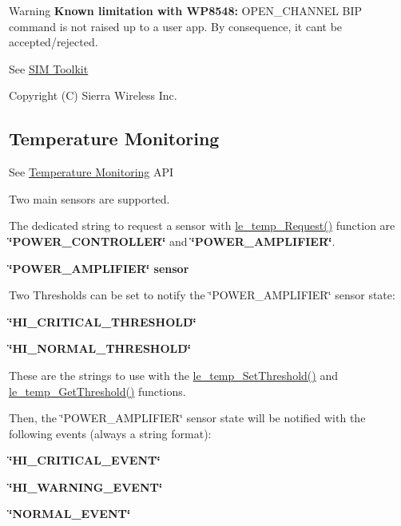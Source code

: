 \begin{DoxyWarning}{Warning}
{\bfseries Known limitation with W\+P8548\+:} O\+P\+E\+N\+\_\+\+C\+H\+A\+N\+N\+EL B\+IP command is not raised up to a user app. By consequence, it can\textquotesingle{}t be accepted/rejected.
\end{DoxyWarning}
See \hyperlink{c_sim_le_sim_stk}{S\+IM Toolkit}

Copyright (C) Sierra Wireless Inc. \hypertarget{platformConstraintsTemperature}{}\subsection{Temperature Monitoring}\label{platformConstraintsTemperature}
See \hyperlink{c_temp}{Temperature Monitoring} A\+PI

Two main sensors are supported.

The dedicated string to request a sensor with \hyperlink{le__temp__interface_8h_ada76ad1c0461ddb13608a942ce0b0912}{le\+\_\+temp\+\_\+\+Request()} function are {\bfseries \char`\"{}\+P\+O\+W\+E\+R\+\_\+\+C\+O\+N\+T\+R\+O\+L\+L\+E\+R\char`\"{}} and {\bfseries \char`\"{}\+P\+O\+W\+E\+R\+\_\+\+A\+M\+P\+L\+I\+F\+I\+E\+R\char`\"{}}.

{\bfseries \char`\"{}\+P\+O\+W\+E\+R\+\_\+\+A\+M\+P\+L\+I\+F\+I\+E\+R\char`\"{} sensor}

Two Thresholds can be set to notify the \char`\"{}\+P\+O\+W\+E\+R\+\_\+\+A\+M\+P\+L\+I\+F\+I\+E\+R\char`\"{} sensor state\+:
\begin{DoxyItemize}
\item {\bfseries \char`\"{}\+H\+I\+\_\+\+C\+R\+I\+T\+I\+C\+A\+L\+\_\+\+T\+H\+R\+E\+S\+H\+O\+L\+D\char`\"{}} 
\item {\bfseries \char`\"{}\+H\+I\+\_\+\+N\+O\+R\+M\+A\+L\+\_\+\+T\+H\+R\+E\+S\+H\+O\+L\+D\char`\"{}} 
\end{DoxyItemize}

These are the strings to use with the \hyperlink{le__temp__interface_8h_a9e21aa40ec65dda6976d0e5fc7b2aec4}{le\+\_\+temp\+\_\+\+Set\+Threshold()} and \hyperlink{le__temp__interface_8h_ac53124401d9333a14d62f938fc640272}{le\+\_\+temp\+\_\+\+Get\+Threshold()} functions.

Then, the \char`\"{}\+P\+O\+W\+E\+R\+\_\+\+A\+M\+P\+L\+I\+F\+I\+E\+R\char`\"{} sensor state will be notified with the following events (always a string format)\+:
\begin{DoxyItemize}
\item {\bfseries \char`\"{}\+H\+I\+\_\+\+C\+R\+I\+T\+I\+C\+A\+L\+\_\+\+E\+V\+E\+N\+T\char`\"{}} 
\item {\bfseries \char`\"{}\+H\+I\+\_\+\+W\+A\+R\+N\+I\+N\+G\+\_\+\+E\+V\+E\+N\+T\char`\"{}} 
\item {\bfseries \char`\"{}\+N\+O\+R\+M\+A\+L\+\_\+\+E\+V\+E\+N\+T\char`\"{}} 
\end{DoxyItemize}

